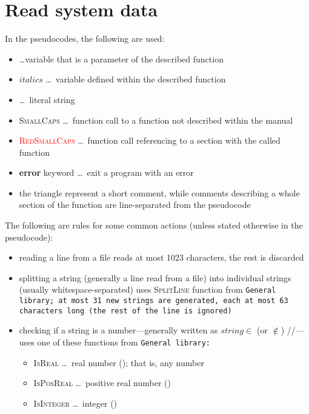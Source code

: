 \section{Read system data} \label{sec:ReadSystemData}

In the pseudocodes, the following are used:
\begin{itemize}
  \item {} \ldots variable that is a parameter of the described
    function
  \item $italics$ \ldots \ variable defined within the described function
  \item {} \ldots \ literal string
  \item \textsc{SmallCaps} \ldots \ function call to a function not described
    within the manual
  \item \textsc{\textcolor{red}{RedSmallCaps}} \ldots \ function call
    referencing to a section with the called function
  \item \textbf{error} keyword \ldots \ exit a program with an error
  \item the triangle represent a short comment, while comments describing a
    whole section of the function are line-separated from the pseudocode
\end{itemize}
The following are rules for some common actions (unless stated otherwise in the
pseudocode):
\begin{itemize}
  \item reading a line from a file reads at most 1023 characters, the rest is
    discarded
  \item splitting a string (generally a line read from a file) into individual
    strings (usually whitespace-separated) uses \textsc{SplitLine} function from
    \tt{General} library; at most 31 new strings are generated, each at most 63
    characters long (the rest of the line is ignored)
  \item checking if a string is a number---generally written as $string
    \in$ (or $\notin$) \Real/\RealP/\Int---uses one of these functions from
    \tt{General} library:
    \begin{itemize}
      \item \textsc{IsReal} \ldots \ real number (\Real); that is, any number
      \item \textsc{IsPosReal} \ldots \ positive real number (\RealP)
      \item \textsc{IsInteger} \ldots \ integer (\Int)
    \end{itemize}
\end{itemize}

